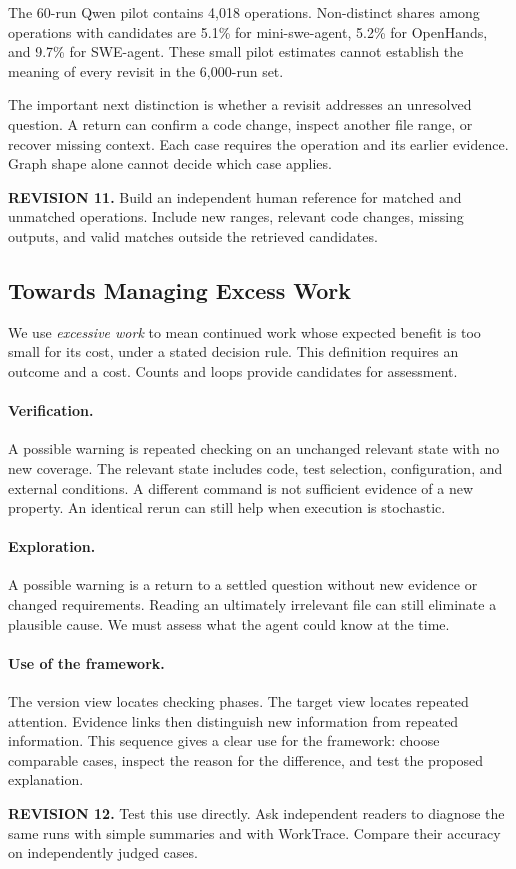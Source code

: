 \documentclass[10pt,a4paper,twocolumn]{article}
\newcommand{\rev}[2]{\par\smallskip\noindent\begin{minipage}{\linewidth}\color{revision}\footnotesize\textbf{REVISION #1.} #2\end{minipage}\par\smallskip}
\begin{document}
The 60-run Qwen pilot contains 4,018 operations. Non-distinct shares among operations with candidates are 5.1\% for mini-swe-agent, 5.2\% for OpenHands, and 9.7\% for SWE-agent. These small pilot estimates cannot establish the meaning of every revisit in the 6,000-run set.

The important next distinction is whether a revisit addresses an unresolved question. A return can confirm a code change, inspect another file range, or recover missing context. Each case requires the operation and its earlier evidence. Graph shape alone cannot decide which case applies.
\rev{11}{Build an independent human reference for matched and unmatched operations. Include new ranges, relevant code changes, missing outputs, and valid matches outside the retrieved candidates.}

\subsection{Towards Managing Excess Work}
We use \emph{excessive work} to mean continued work whose expected benefit is too small for its cost, under a stated decision rule. This definition requires an outcome and a cost. Counts and loops provide candidates for assessment.

\paragraph{Verification.}
A possible warning is repeated checking on an unchanged relevant state with no new coverage. The relevant state includes code, test selection, configuration, and external conditions. A different command is not sufficient evidence of a new property. An identical rerun can still help when execution is stochastic.

\paragraph{Exploration.}
A possible warning is a return to a settled question without new evidence or changed requirements. Reading an ultimately irrelevant file can still eliminate a plausible cause. We must assess what the agent could know at the time.

\paragraph{Use of the framework.}
The version view locates checking phases. The target view locates repeated attention. Evidence links then distinguish new information from repeated information. This sequence gives a clear use for the framework: choose comparable cases, inspect the reason for the difference, and test the proposed explanation.
\rev{12}{Test this use directly. Ask independent readers to diagnose the same runs with simple summaries and with WorkTrace. Compare their accuracy on independently judged cases.}
\end{document}
